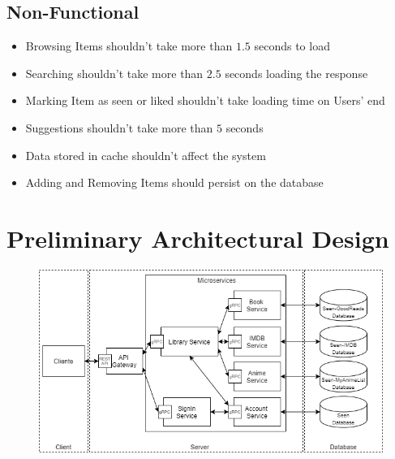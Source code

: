 \documentclass{article}
\begin{document}
  \subsection{Non-Functional}
    \begin{itemize}
      \item Browsing Items shouldn't take more than $1.5$ seconds to load
      \item Searching shouldn't take more than $2.5$ seconds loading the response
      \item Marking Item as seen or liked shouldn't take loading time on Users' end
      \item Suggestions shouldn't take more than $5$ seconds
      \item Data stored in cache shouldn't affect the system
      \item Adding and Removing Items should persist on the database
    \end{itemize}

\section{Preliminary Architectural Design}
  \begin{figure}[H]
    \centering
    \includegraphics[width=\textwidth]{"images/CloudNativeAppArchitecture.png"}
  \end{figure}
\end{document}
